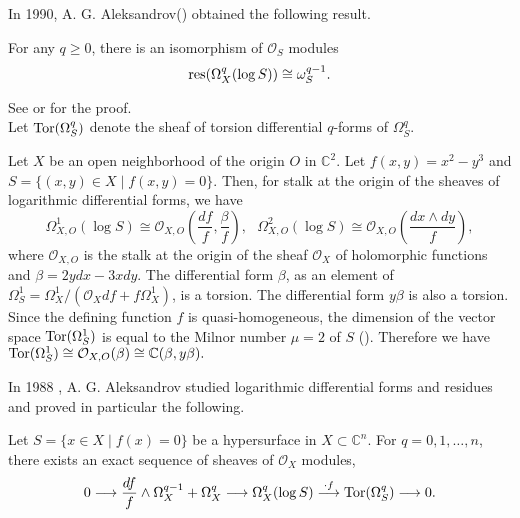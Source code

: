 \documentclass[pdftex]{arxsigma}
\begin{document}
In 1990, A. G. Aleksandrov(\cite{A}) obtained the following result.

\begin{theorem}
  For any $ q \geq 0$, there is an isomorphism of $ {\mathcal O}_S $ modules
\begin{equation*}
{\rm res}(\Omega_X^{q}(\log S)) \cong \omega_S^{q-1}. 
\end{equation*}

\end{theorem}

See \cite{A} or \cite{A05} for the proof.\\



Let $ {\rm Tor}(\Omega_S^{q}) $ denote the sheaf of torsion differential $q$-forms of $ \Omega_S^{q}. $

\begin{example}
Let $ X $ be an open neighborhood of the origin $O$ in $ \mathbb{C}^2.$ Let $ f(x,y)=x^2-y^3$ and $ S=\{ (x,y) \in X \mid f(x,y)=0 \}. $ Then, for stalk at the origin of the sheaves of logarithmic differential forms, we have
\begin{equation*}
\Omega_{X,O}^{1}(\log S) \cong {\mathcal O}_{X,O}\left(\frac{df}{f}, \frac{\beta}{f}\right), \ \ \ \Omega_{X,O}^{2}(\log S) \cong {\mathcal O}_{X,O}\left(\frac{dx\wedge dy}{f}\right),
\end{equation*}
where $ {\mathcal O}_{X,O} $ is the stalk at the origin of the sheaf $ {\mathcal O}_X $ of holomorphic functions and  $ \beta=2y dx-3xdy. $ The differential form $\beta$, as an element of $ \Omega_S^{1} = \Omega_X^{1}/(\mathcal{O}_{X}df +f\Omega_X^{1}) $, is a torsion. The differential form $y\beta$ is also a torsion. Since the defining function $f$ is quasi-homogeneous, the dimension of the vector space $ {\rm Tor}(\Omega_S^{1})$ is equal to the Milnor number $\mu=2 $ of $S$ (\cite{M, Z}). Therefore we have 
$ {\rm Tor}(\Omega_S^{1}) \cong {\mathcal O}_{X,O}(\beta) \cong {\mathbb C}(\beta, y\beta). $
\end{example}

In 1988 \cite{A88}, A. G. Aleksandrov studied logarithmic differential forms and residues and proved in particular the following.

\begin{theorem} 
Let $S=\{ x \in X \mid f(x) =0 \} $ be a hypersurface in $X \subset {\mathbb C}^n.$ For $ q=0,1,\ldots,n $, there exists an exact sequence of sheaves of $ {\mathcal O}_{X} $ modules, 
\begin{equation*}
0 \longrightarrow\frac{df}{f} \wedge \Omega_{X}^{q-1}+ \Omega_{X}^{q} \longrightarrow 
\Omega_{X}^{q}(\log S) \stackrel{\cdot f}\longrightarrow {\rm Tor}(\Omega_{S}^{q}) \longrightarrow 0. 
\end{equation*}

\end{theorem}
\end{document}
